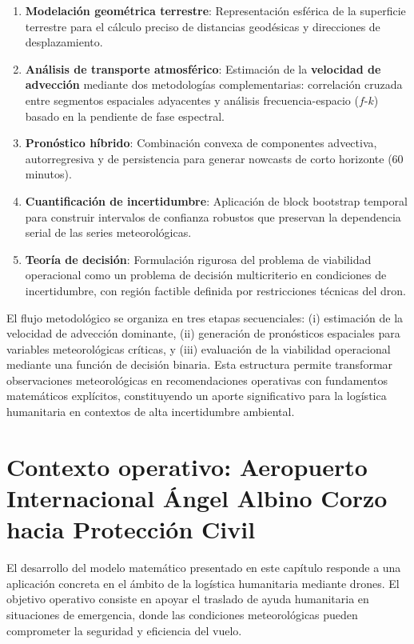 \documentclass[
  spanish,
  us-letterpaper,
]{scrreprt}
\numberwithin{equation}{section}
\begin{document}
\begin{enumerate}
\def\labelenumi{\arabic{enumi}.}
\item
  \textbf{Modelación geométrica terrestre}: Representación esférica de
  la superficie terrestre para el cálculo preciso de distancias
  geodésicas y direcciones de desplazamiento.
\item
  \textbf{Análisis de transporte atmosférico}: Estimación de la
  \textbf{velocidad de advección} mediante dos metodologías
  complementarias: correlación cruzada entre segmentos espaciales
  adyacentes y análisis frecuencia-espacio (\(f\)-\(k\)) basado en la
  pendiente de fase espectral.
\item
  \textbf{Pronóstico híbrido}: Combinación convexa de componentes
  advectiva, autorregresiva y de persistencia para generar nowcasts de
  corto horizonte (60 minutos).
\item
  \textbf{Cuantificación de incertidumbre}: Aplicación de block
  bootstrap temporal para construir intervalos de confianza robustos que
  preservan la dependencia serial de las series meteorológicas.
\item
  \textbf{Teoría de decisión}: Formulación rigurosa del problema de
  viabilidad operacional como un problema de decisión multicriterio en
  condiciones de incertidumbre, con región factible definida por
  restricciones técnicas del dron.
\end{enumerate}

El flujo metodológico se organiza en tres etapas secuenciales: (i)
estimación de la velocidad de advección dominante, (ii) generación de
pronósticos espaciales para variables meteorológicas críticas, y (iii)
evaluación de la viabilidad operacional mediante una función de decisión
binaria. Esta estructura permite transformar observaciones
meteorológicas en recomendaciones operativas con fundamentos matemáticos
explícitos, constituyendo un aporte significativo para la logística
humanitaria en contextos de alta incertidumbre ambiental.

\section{Contexto operativo: Aeropuerto Internacional Ángel Albino Corzo
hacia Protección
Civil}\label{contexto-operativo-aeropuerto-internacional-uxe1ngel-albino-corzo-hacia-protecciuxf3n-civil}

El desarrollo del modelo matemático presentado en este capítulo responde
a una aplicación concreta en el ámbito de la logística humanitaria
mediante drones. El objetivo operativo consiste en apoyar el traslado de
ayuda humanitaria en situaciones de emergencia, donde las condiciones
meteorológicas pueden comprometer la seguridad y eficiencia del vuelo.
\end{document}
